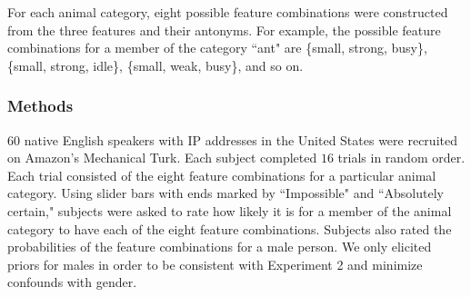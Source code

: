 \documentclass[10pt,letterpaper]{article}
\begin{document}
For each animal category, eight possible feature combinations were constructed from the three features and their antonyms. For example, the possible feature combinations for a member of the category ``ant" are \{small, strong, busy\}, \{small, strong, idle\}, \{small, weak, busy\}, and so on.

\subsubsection{Methods}
$60$ native English speakers with IP addresses in the United States were recruited on Amazon's Mechanical Turk. Each subject completed $16$ trials in random order. Each trial consisted of the eight feature combinations for a particular animal category. Using slider bars with ends marked by ``Impossible" and ``Absolutely certain," subjects were asked to rate how likely it is for a member of the animal category to have each of the eight feature combinations. Subjects also rated the probabilities of the feature combinations for a male person. We only elicited priors for males in order to be consistent with Experiment 2 and minimize confounds with gender.
\end{document}
